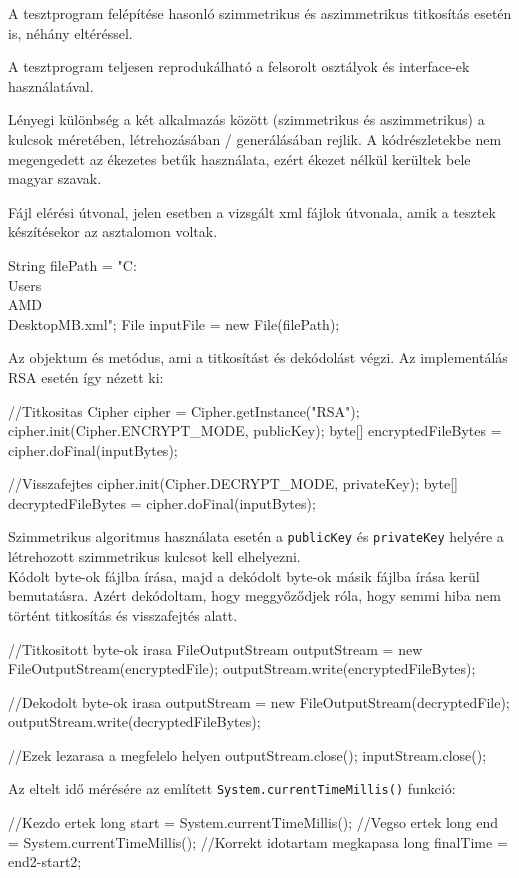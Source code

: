 \noindent A tesztprogram felépítése hasonló szimmetrikus és aszimmetrikus titkosítás esetén is, néhány eltéréssel.

A tesztprogram teljesen reprodukálható a felsorolt osztályok és interface-ek használatával.

Lényegi különbség a két alkalmazás között (szimmetrikus és aszimmetrikus) a kulcsok méretében, létrehozásában / generálásában rejlik. A kódrészletekbe nem megengedett az ékezetes betűk használata, ezért ékezet nélkül kerültek bele magyar szavak.

Fájl elérési útvonal, jelen esetben a vizsgált xml fájlok útvonala, amik a tesztek készítésekor az asztalomon voltak.
\begin{java}
String filePath = "C:\\Users\\AMD\\Desktop\2MB.xml";
File inputFile = new File(filePath);
\end{java}

Az objektum és metódus, ami a titkosítást és dekódolást végzi. Az implementálás RSA esetén így nézett ki:
\begin{java}
//Titkositas
Cipher cipher = Cipher.getInstance("RSA");
cipher.init(Cipher.ENCRYPT_MODE, publicKey);
byte[] encryptedFileBytes = cipher.doFinal(inputBytes);

//Visszafejtes
cipher.init(Cipher.DECRYPT_MODE, privateKey);
byte[] decryptedFileBytes = cipher.doFinal(inputBytes);
\end{java}
Szimmetrikus algoritmus használata esetén a \texttt{publicKey} és \texttt{privateKey} helyére a létrehozott szimmetrikus kulcsot kell elhelyezni.
\vspace{5pt}\\Kódolt byte-ok fájlba írása, majd a dekódolt byte-ok másik fájlba írása kerül bemutatásra. Azért dekódoltam, hogy meggyőződjek róla, hogy semmi hiba nem történt titkosítás és visszafejtés alatt.
\begin{java}
//Titkositott byte-ok irasa
FileOutputStream outputStream = 
			new FileOutputStream(encryptedFile);
outputStream.write(encryptedFileBytes);
	
//Dekodolt byte-ok irasa
outputStream = new FileOutputStream(decryptedFile);
outputStream.write(decryptedFileBytes);
	
//Ezek lezarasa a megfelelo helyen
outputStream.close();
inputStream.close();
\end{java}

Az eltelt idő mérésére az említett \texttt{System.currentTimeMillis()} funkció:
\begin{java}
//Kezdo ertek
long start = System.currentTimeMillis();
//Vegso ertek
long end = System.currentTimeMillis();	
//Korrekt idotartam megkapasa
long finalTime = end2-start2;	
\end{java}

